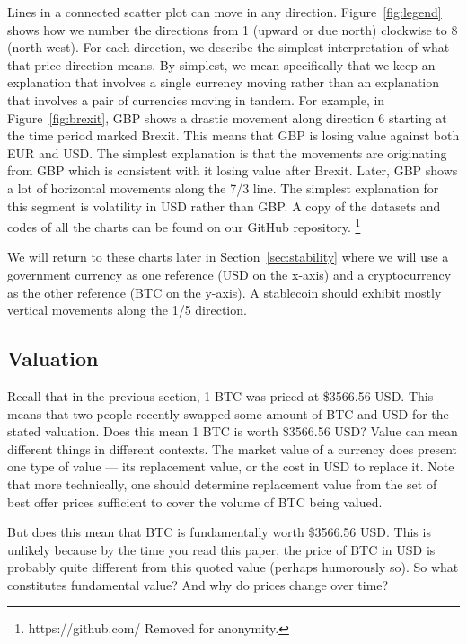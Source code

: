 Lines in a connected scatter plot can move in any direction. Figure~\ref{fig:legend} shows how we number the directions from 1 (upward or due north) clockwise to 8 (north-west). For each direction, we describe the simplest interpretation of what that price direction means. By simplest, we mean specifically that we keep an explanation that involves a single currency moving rather than an explanation that involves a pair of currencies moving in tandem. For example, in Figure~\ref{fig:brexit}, GBP shows a drastic movement along direction 6 starting at the time period marked Brexit. This means that GBP is losing value against both EUR and USD. The simplest explanation is that the movements are originating from GBP which is consistent with it losing value after Brexit. Later, GBP shows a lot of horizontal movements along the 7/3 line. The simplest explanation for this segment is volatility in USD rather than GBP.
A copy of the datasets and codes of all the charts can be found on our GitHub repository. \footnote{https://github.com/ Removed for anonymity.}


We will return to these charts later in Section~\ref{sec:stability} where we will use a government currency as one reference (USD on the x-axis) and a cryptocurrency as the other reference (BTC on the y-axis). A stablecoin should exhibit mostly vertical movements along the 1/5 direction.

\subsection{Valuation}

Recall that in the previous section, 1 BTC was priced at \$3566.56 USD. This means that two people recently swapped some amount of BTC and USD for the stated valuation. Does this mean 1 BTC is worth \$3566.56 USD? Value can mean different things in different contexts. The market value of a currency does present one type of value --- its replacement value, or the cost in USD to replace it. Note that more technically, one should  determine replacement value from the set of best offer prices sufficient to cover the volume of BTC being valued.

But does this mean that BTC is fundamentally worth \$3566.56 USD. This is unlikely because by the time you read this paper, the price of BTC in USD is probably quite different from this quoted value (perhaps humorously so). So what constitutes fundamental value? And why do prices change over time?

